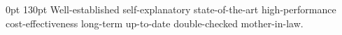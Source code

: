 \documentclass{article}
\begin{document}
 0pt 130pt Well-established self-explanatory state-of-the-art high-performance cost-effectiveness long-term up-to-date double-checked mother-in-law.
\end{document}
